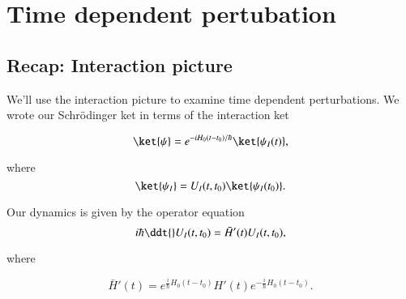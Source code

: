 %
%

\chapter{Time dependent pertubation}
\label{chap:qmTwoL7}
{}
\date{Sept 25, 2011}

\beginArtNoToc

%

\section{Recap: Interaction picture}

We'll use the interaction picture to examine time dependent perturbations.  We wrote our Schr\"{o}dinger ket in terms of the interaction ket

\begin{equation}\label{eqn:qmTwoL7:10}
\ket{\psi}
= e^{-i H_0 (t - t_0)/\hbar}
\ket{\psi_I(t)},
\end{equation}

where
\begin{equation}\label{eqn:qmTwoL7:30}
\ket{\psi_I}
= U_I(t, t_0) \ket{\psi_I(t_0)}.
\end{equation}

Our dynamics is given by the operator equation
\begin{equation}\label{eqn:qmTwoL7:50}
i \hbar \ddt{} U_I(t, t_0) = \bar{H}'(t) U_I(t, t_0),
\end{equation}

where

\begin{equation}\label{eqn:qmTwoL7:70}
\bar{H}'(t) =
e^{\frac{i}{\hbar} H_0(t - t_0)} H'(t) e^{-\frac{i}{\hbar} H_0(t - t_0)}.
\end{equation}

